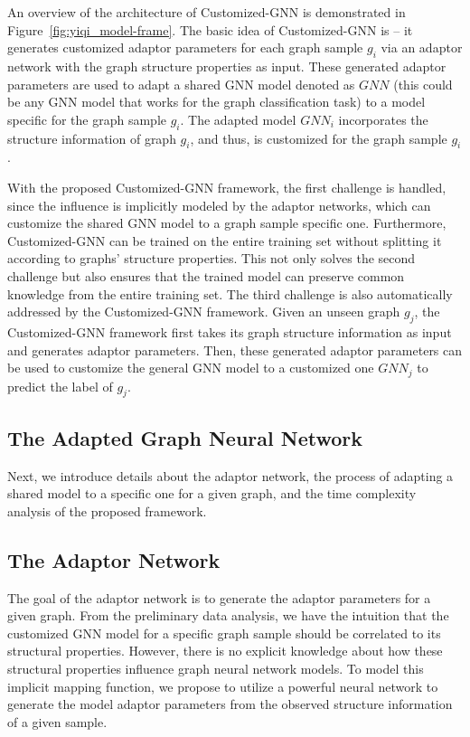 \documentclass[11pt,dvipdfm]{article}
\begin{document}
An overview of the architecture of Customized-GNN is demonstrated in Figure~\ref{fig:yiqi_model-frame}. The basic idea of Customized-GNN is -- it generates customized adaptor parameters for each graph sample $g_i$ via an adaptor network with the graph structure properties as input. These generated adaptor parameters are used to adapt a shared GNN model denoted as $GNN$ (this could be any GNN model that works for the graph classification task) to a model specific for the graph sample $g_i$. The adapted model $GNN_i$ incorporates the structure information of graph $g_i$, and thus, is customized for the graph sample $g_i$.

With the proposed Customized-GNN framework, the first challenge is handled, since the influence is implicitly modeled by the adaptor networks, which can customize the shared GNN model to a graph sample specific one. Furthermore, Customized-GNN can be trained on the entire training set without splitting it according to graphs' structure properties. This not only solves the second challenge but also ensures that the trained model can preserve common knowledge from the entire training set. The third challenge is also automatically addressed by the Customized-GNN framework. Given an unseen graph $g_j$, the Customized-GNN framework first takes its graph structure information as input and generates adaptor parameters. Then, these generated adaptor parameters can be used to customize the general GNN model to a customized one $GNN_j$ to predict the label of $g_j$. 


\subsection{ The Adapted Graph Neural Network}\label{the_adapted_model}



Next, we introduce details about the adaptor network, the process of adapting a shared model to a specific one for a given graph, and the time complexity analysis of the proposed framework. 



\subsection{The Adaptor Network}

The goal of the adaptor network is to generate the adaptor parameters for a given graph. From the preliminary data analysis, we have the intuition that the customized GNN model for a specific graph sample should be correlated to its structural properties. However, there is no explicit knowledge about how these structural properties influence graph neural network models. To model this implicit mapping function, we propose to utilize a powerful neural network to generate the model adaptor parameters from the observed structure information of a given sample.
\end{document}

